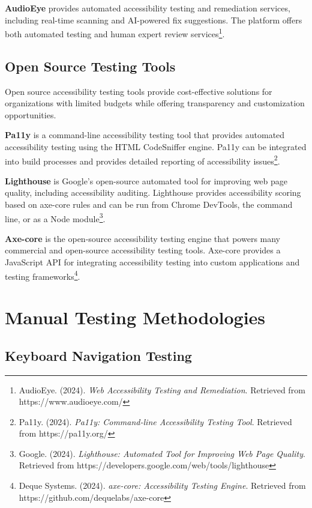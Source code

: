 \textbf{AudioEye} provides automated accessibility testing and remediation services, including real-time scanning and AI-powered fix suggestions. The platform offers both automated testing and human expert review services\footnote{AudioEye. (2024). \textit{Web Accessibility Testing and Remediation}. Retrieved from https://www.audioeye.com/}.

\subsection{Open Source Testing Tools}

Open source accessibility testing tools provide cost-effective solutions for organizations with limited budgets while offering transparency and customization opportunities.

\textbf{Pa11y} is a command-line accessibility testing tool that provides automated accessibility testing using the HTML CodeSniffer engine. Pa11y can be integrated into build processes and provides detailed reporting of accessibility issues\footnote{Pa11y. (2024). \textit{Pa11y: Command-line Accessibility Testing Tool}. Retrieved from https://pa11y.org/}.

\textbf{Lighthouse} is Google's open-source automated tool for improving web page quality, including accessibility auditing. Lighthouse provides accessibility scoring based on axe-core rules and can be run from Chrome DevTools, the command line, or as a Node module\footnote{Google. (2024). \textit{Lighthouse: Automated Tool for Improving Web Page Quality}. Retrieved from https://developers.google.com/web/tools/lighthouse}.

\textbf{Axe-core} is the open-source accessibility testing engine that powers many commercial and open-source accessibility testing tools. Axe-core provides a JavaScript API for integrating accessibility testing into custom applications and testing frameworks\footnote{Deque Systems. (2024). \textit{axe-core: Accessibility Testing Engine}. Retrieved from https://github.com/dequelabs/axe-core}.

\section{Manual Testing Methodologies}

\subsection{Keyboard Navigation Testing}

